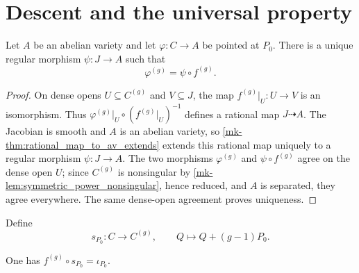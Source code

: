 \section{Descent and the universal property}
\label{mk-sec:albaneseup_descent}

\begin{lemma}
  \label{mk-lem:descent_through_birational_sigma}


  Let \(A\) be an abelian variety and let
  \(\varphi\colon C\to A\) be pointed at \(P_0\).  There is a unique
  regular morphism \(\psi\colon J\to A\) such that
  \[
    \varphi^{(g)}=\psi\circ f^{(g)}.
  \]
\end{lemma}

\begin{proof}
  On dense opens \(U\subseteq C^{(g)}\) and \(V\subseteq J\), the map
  \(f^{(g)}|_U\colon U\to V\) is an isomorphism.  Thus
  \(\varphi^{(g)}|_U\circ(f^{(g)}|_U)^{-1}\) defines a rational map
  \(J\dashrightarrow A\).  The Jacobian is smooth and \(A\) is an abelian
  variety, so \ref{mk-thm:rational_map_to_av_extends} extends this rational
  map uniquely to a regular morphism \(\psi\colon J\to A\).  The two
  morphisms \(\varphi^{(g)}\) and \(\psi\circ f^{(g)}\) agree on the dense
  open \(U\); since \(C^{(g)}\) is nonsingular by
  \ref{mk-lem:symmetric_power_nonsingular}, hence reduced, and \(A\) is
  separated, they agree everywhere.  The same dense-open agreement proves
  uniqueness.
\end{proof}

\begin{definition}
  \label{mk-def:basepoint_section_symmetric_power}

  Define
  \[
    s_{P_0}\colon C\longrightarrow C^{(g)},\qquad
    Q\longmapsto Q+(g-1)P_0.
  \]
\end{definition}

\begin{lemma}
  \label{mk-lem:basepoint_section_to_jacobian}

  One has \(f^{(g)}\circ s_{P_0}=\iota_{P_0}\).
\end{lemma}

